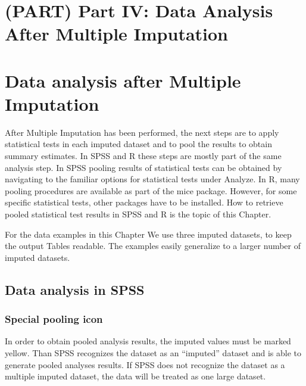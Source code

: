 \documentclass[
]{book}
\begin{document}
\hypertarget{part-part-iv-data-analysis-after-multiple-imputation}{%
\chapter*{(PART) Part IV: Data Analysis After Multiple
Imputation}\label{part-part-iv-data-analysis-after-multiple-imputation}}

\hypertarget{data-analysis-after-multiple-imputation}{%
\chapter{Data analysis after Multiple
Imputation}\label{data-analysis-after-multiple-imputation}}

After Multiple Imputation has been performed, the next steps are to
apply statistical tests in each imputed dataset and to pool the results
to obtain summary estimates. In SPSS and R these steps are mostly part
of the same analysis step. In SPSS pooling results of statistical tests
can be obtained by navigating to the familiar options for statistical
tests under Analyze. In R, many pooling procedures are available as part
of the mice package. However, for some specific statistical tests, other
packages have to be installed. How to retrieve pooled statistical test
results in SPSS and R is the topic of this Chapter.

For the data examples in this Chapter We use three imputed datasets, to
keep the output Tables readable. The examples easily generalize to a
larger number of imputed datasets.

\hypertarget{data-analysis-in-spss}{%
\section{Data analysis in SPSS}\label{data-analysis-in-spss}}

\hypertarget{special-pooling-icon}{%
\subsection{Special pooling icon}\label{special-pooling-icon}}

In order to obtain pooled analysis results, the imputed values must be
marked yellow. Than SPSS recognizes the dataset as an ``imputed''
dataset and is able to generate pooled analyses results. If SPSS does
not recognize the dataset as a multiple imputed dataset, the data will
be treated as one large dataset.
\end{document}
